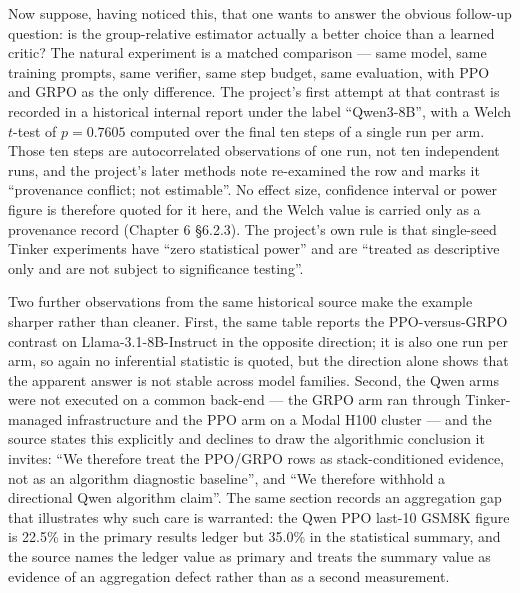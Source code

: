 \documentclass[12pt,a4paper]{report}
\begin{document}
Now suppose, having noticed this, that one wants to answer the obvious
follow-up question: is the group-relative estimator actually a better
choice than a learned critic? The natural experiment is a matched
comparison --- same model, same training prompts, same verifier, same
step budget, same evaluation, with PPO and GRPO as the only difference.
The project's first attempt at that contrast is recorded in a historical
internal report under the label ``Qwen3-8B'', with a Welch \(t\)-test of
\(p = 0.7605\) computed over the final ten steps of a single run per
arm. Those ten steps are autocorrelated observations of one run, not ten
independent runs, and the project's later methods note re-examined the
row and marks it ``provenance conflict; not estimable''. No effect size,
confidence interval or power figure is therefore quoted for it here, and
the Welch value is carried only as a provenance record (Chapter 6
§6.2.3). The project's own rule is that single-seed Tinker experiments
have ``zero statistical power'' and are ``treated as descriptive only
and are not subject to significance testing''.

Two further observations from the same historical source make the
example sharper rather than cleaner. First, the same table reports the
PPO-versus-GRPO contrast on Llama-3.1-8B-Instruct in the opposite
direction; it is also one run per arm, so again no inferential statistic
is quoted, but the direction alone shows that the apparent answer is not
stable across model families. Second, the Qwen arms were not executed on
a common back-end --- the GRPO arm ran through Tinker-managed
infrastructure and the PPO arm on a Modal H100 cluster --- and the
source states this explicitly and declines to draw the algorithmic
conclusion it invites: ``We therefore treat the PPO/GRPO rows as
stack-conditioned evidence, not as an algorithm diagnostic baseline'',
and ``We therefore withhold a directional Qwen algorithm claim''. The
same section records an aggregation gap that illustrates why such care
is warranted: the Qwen PPO last-10 GSM8K figure is 22.5\% in the primary
results ledger but 35.0\% in the statistical summary, and the source
names the ledger value as primary and treats the summary value as
evidence of an aggregation defect rather than as a second measurement.
\end{document}
